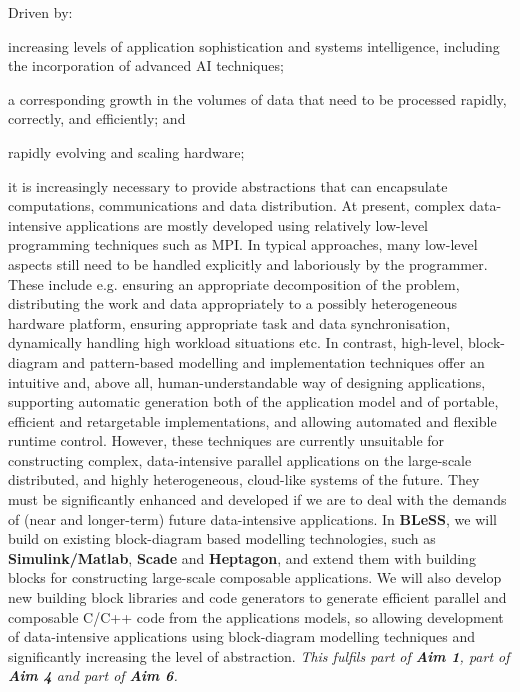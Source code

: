 \documentclass[a4paper,11pt]{article}
\newcommand{\project}[1]{\textbf{#1}\xspace}
\newcommand{\BLESS}{\project{BLeSS}}
\newcommand{\TheProject}{\BLESS}
\begin{document}
Driven by:
\begin{inparaenum}[i)]
\item
increasing levels of application sophistication and systems intelligence, including the incorporation of advanced AI
techniques;
\item
a corresponding growth in the volumes of data that need to be processed rapidly, correctly, and efficiently;
and
\item
rapidly evolving and scaling hardware;
\end{inparaenum}
it is increasingly necessary to provide abstractions that can encapsulate computations, communications and data distribution.
%
At present, complex data-intensive applications are mostly developed using relatively low-level programming 
techniques such as MPI. %
In typical approaches, many low-level aspects still need to be handled explicitly and laboriously by the programmer. 
These include e.g. ensuring an appropriate decomposition of the problem,
distributing the work and data appropriately to a  possibly  heterogeneous hardware platform, ensuring appropriate
task and data synchronisation, dynamically handling high workload situations etc.
%
In contrast, high-level, block-diagram and pattern-based modelling and implementation
techniques offer an intuitive and, above all, human-understandable way of designing
applications, supporting automatic generation both of the application model and of
portable, efficient and retargetable implementations, and allowing automated and flexible
runtime control.
However, these techniques are currently unsuitable for constructing complex, data-intensive parallel
applications on the large-scale distributed, and highly heterogeneous, cloud-like systems of the future. 
They must be significantly enhanced and developed if we are to deal with the demands of (near and longer-term) future
data-intensive applications.  In \TheProject{}, we will build on existing block-diagram based modelling technologies, such
as \textbf{Simulink/Matlab}, \textbf{Scade} and \textbf{Heptagon}, and extend them with
building blocks for constructing large-scale composable  applications. We will also develop new building block libraries and code generators
to generate efficient parallel and composable C/C++ code from the applications models, 
so allowing development of data-intensive applications using block-diagram modelling techniques
and significantly increasing the level of abstraction.
\newline
\emph{This fulfils part of \textbf{Aim 1}, part of \textbf{Aim 4} and part of \textbf{Aim 6}.}
\end{document}
